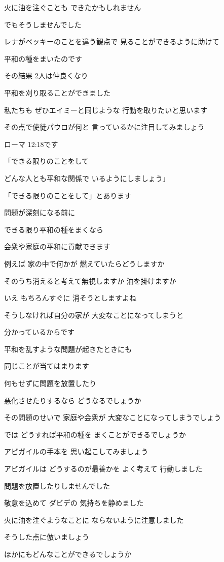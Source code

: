 \documentclass[twocolumn]{jsarticle}
\begin{document}
火に油を注ぐことも
できたかもしれません

でもそうしませんでした

レナがベッキーのことを違う観点で
見ることができるように助けて

平和の種をまいたのです

その結果 2人は仲良くなり

平和を刈り取ることができました

私たちも ぜひエイミーと同じような
行動を取りたいと思います

その点で使徒パウロが何と
言っているかに注目してみましょう

ローマ 12:18です

「できる限りのことをして

どんな人とも平和な関係で
いるようにしましょう」

「できる限りのことをして」とあります

問題が深刻になる前に

できる限り平和の種をまくなら

会衆や家庭の平和に貢献できます

例えば 家の中で何かが
燃えていたらどうしますか

そのうち消えると考えて無視しますか
油を掛けますか

いえ もちろんすぐに
消そうとしますよね

そうしなければ自分の家が
大変なことになってしまうと

分かっているからです

平和を乱すような問題が起きたときにも

同じことが当てはまります

何もせずに問題を放置したり

悪化させたりするなら
どうなるでしょうか

その問題のせいで 家庭や会衆が
大変なことになってしまうでしょう

では どうすれば平和の種を
まくことができるでしょうか

アビガイルの手本を
思い起こしてみましょう

アビガイルは どうするのが最善かを
よく考えて 行動しました

問題を放置したりしませんでした

敬意を込めて ダビデの
気持ちを静めました

火に油を注ぐようなことに
ならないように注意しました

そうした点に倣いましょう

ほかにもどんなことができるでしょうか
\end{document}

